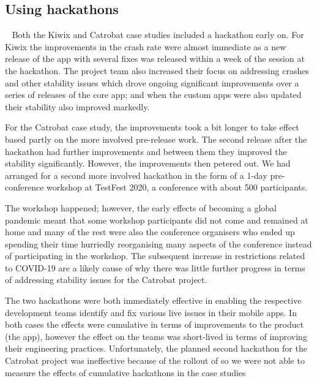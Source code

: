 \subsection{Using hackathons}~\label{discussion-half-life-of-hackathons}
Both the Kiwix and Catrobat case studies included a hackathon early on. For Kiwix the improvements in the crash rate were almost immediate as a new release of the app with several fixes was released within a week of the session at the hackathon. The project team also increased their focus on addressing crashes and other stability issues which drove ongoing significant improvements over a series of releases of the core app; and when the custom apps were also updated their stability also improved markedly. %

For the Catrobat case study, the improvements took a bit longer to take effect based partly on the more involved pre-release work. The second release after the hackathon had further improvements and between them they improved the stability significantly. %
However, the improvements then petered out. We had arranged for a second more involved hackathon in the form of a 1-day pre-conference workshop at TestFest 2020, a conference with about 500 participants. %

The workshop happened; however, the early effects of  becoming a global pandemic meant that some workshop participants did not come and remained at home and many of the rest were also the conference organisers who ended up spending their time hurriedly reorganising many aspects of the conference instead of participating in the workshop. The subsequent increase in restrictions related to COVID-19 are a likely cause of why there was little further progress in terms of addressing stability issues for the Catrobat project.

The two hackathons were both immediately effective in enabling the respective development teams identify and fix various live issues in their mobile apps. In both cases the effects were cumulative in terms of improvements to the product (the app), however the effect on the teams was short-lived in terms of improving their engineering practices. Unfortunately, the planned second hackathon for the Catrobat project was ineffective because of the rollout of  so we were not able to measure the effects of cumulative hackathons in the case studies~

